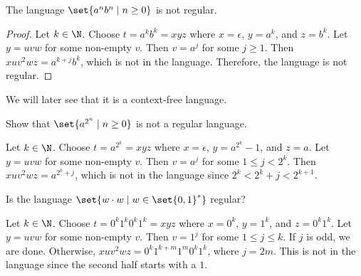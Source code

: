 \begin{proposition*}
    The language $\set{a^n b^n \mid n \ge 0}$ is not regular.
\end{proposition*}
\begin{proof}
    Let $k \in \N$.
    Choose $t = a^k b^k = xyz$ where $x = \epsilon$, $y = a^k$, and $z = b^k$.
    Let $y = uvw$ for some non-empty $v$.
    Then $v = a^j$ for some $j \ge 1$.
    Then $x u v^2 w z = a^{k + j} b^k$, which is not in the language.
    Therefore, the language is not regular.
\end{proof}
We will later see that it is a context-free language.

\begin{exercise}
    Show that $\set{a^{2^n} \mid n \ge 0}$ is not a regular language.
\end{exercise}
\begin{solution}
    Let $k \in \N$.
    Choose $t = a^{2^k} = xyz$ where $x = \epsilon$, $y = a^{2^k} - 1$, and
    $z = a$.
    Let $y = uvw$ for some non-empty $v$.
    Then $v = a^j$ for some $1 \le j < 2^k$.
    Then $x u v^2 w z = a^{2^k + j}$, which is not in the language
    since $2^k < 2^k + j < 2^{k + 1}$.
\end{solution}

\begin{exercise}
    Is the language $\set{w \cdot w \mid w \in \set{0, 1}^*}$ regular?
\end{exercise}
\begin{solution}
    Let $k \in \N$.
    Choose $t = 0^k 1^k 0^k 1^k = xyz$ where $x = 0^k$, $y = 1^k$, and
    $z = 0^k 1^k$.
    Let $y = uvw$ for some non-empty $v$.
    Then $v = 1^j$ for some $1 \le j \le k$.
    If $j$ is odd, we are done.
    Otherwise, $x u v^2 w z = 0^k 1^{k + m} 1^m 0^k 1^k$, where $j = 2m$.
    This is not in the language since the second half starts with a $1$.
\end{solution}
